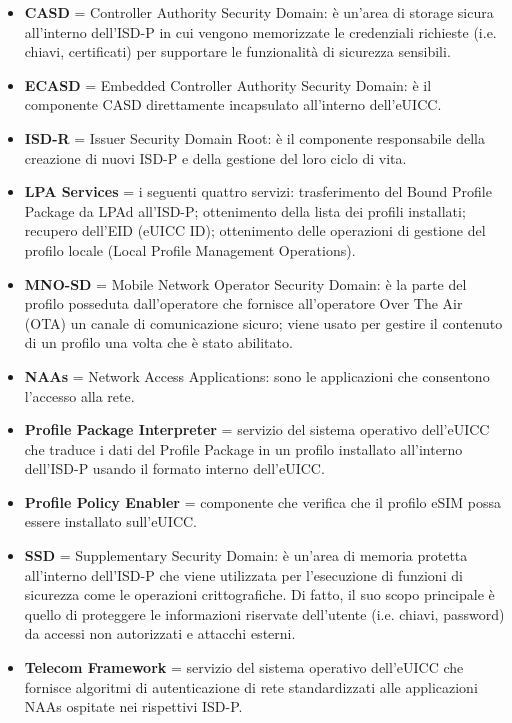 \documentclass[10pt, oneside]{book}
\begin{document}
\begin{itemize}
\item \textbf{CASD} = Controller Authority Security Domain: è un'area di storage sicura all'interno dell'ISD-P in cui vengono memorizzate le credenziali richieste (i.e. chiavi, certificati) per supportare le funzionalità di sicurezza sensibili.
\item \textbf{ECASD} = Embedded Controller Authority Security Domain: è il componente CASD direttamente incapsulato all'interno dell'eUICC.
\item \textbf{ISD-R} = Issuer Security Domain Root: è il componente responsabile della creazione di nuovi ISD-P e della gestione del loro ciclo di vita.
\item \textbf{LPA Services} = i seguenti quattro servizi: trasferimento del Bound Profile Package da LPAd all'ISD-P; ottenimento della lista dei profili installati; recupero dell'EID (eUICC ID); ottenimento delle operazioni di gestione del profilo locale (Local Profile Management Operations).
\item \textbf{MNO-SD} = Mobile Network Operator Security Domain: è la parte del profilo posseduta dall'operatore che fornisce all'operatore Over The Air (OTA) un canale di comunicazione sicuro; viene usato per gestire il contenuto di un profilo una volta che è stato abilitato.
\item \textbf{NAAs} = Network Access Applications: sono le applicazioni che consentono l'accesso alla rete.
\item \textbf{Profile Package Interpreter} = servizio del sistema operativo dell'eUICC che traduce i dati del Profile Package in un profilo installato all'interno dell'ISD-P usando il formato interno dell'eUICC.
\item \textbf{Profile Policy Enabler} = componente che verifica che il profilo eSIM possa essere installato sull’eUICC.
\item \textbf{SSD} = Supplementary Security Domain: è un'area di memoria protetta all'interno dell'ISD-P che viene utilizzata per l'esecuzione di funzioni di sicurezza come le operazioni crittografiche. Di fatto, il suo scopo principale è quello di proteggere le informazioni riservate dell'utente (i.e. chiavi, password) da accessi non autorizzati e attacchi esterni.
\item \textbf{Telecom Framework} = servizio del sistema operativo dell'eUICC che fornisce algoritmi di autenticazione di rete standardizzati alle applicazioni NAAs ospitate nei rispettivi ISD-P.
\end{itemize}
\end{document}
